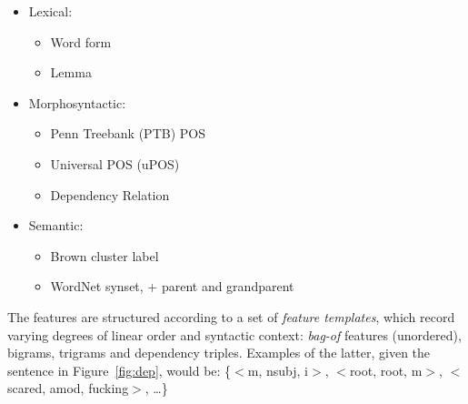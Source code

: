 \documentclass[11pt,letterpaper]{article}
\begin{document}
\begin{itemize}[noitemsep]
\item Lexical:
  \begin{itemize}[noitemsep]
  \item Word form
  \item Lemma
  \end{itemize}
  
\item Morphosyntactic:
  \begin{itemize}[noitemsep]
  \item Penn Treebank (PTB) POS
  \item Universal POS (uPOS)
  \item Dependency Relation
  \end{itemize}
  
\item Semantic:
  \begin{itemize}[noitemsep]
    \item Brown cluster label %
    \item WordNet synset, + parent and grandparent
  \end{itemize}
\end{itemize}

The features are structured according to a set of \emph{feature templates},
which record varying degrees of linear order and syntactic context:
\emph{bag-of} features (unordered), bigrams, trigrams and dependency
triples. Examples of the latter, given the sentence in Figure~\ref{fig:dep},
would be: \{$<$m, nsubj, i$>$, $<$root, root, m$>$, $<$scared, amod, fucking$>$, \ldots \}

\end{document}
